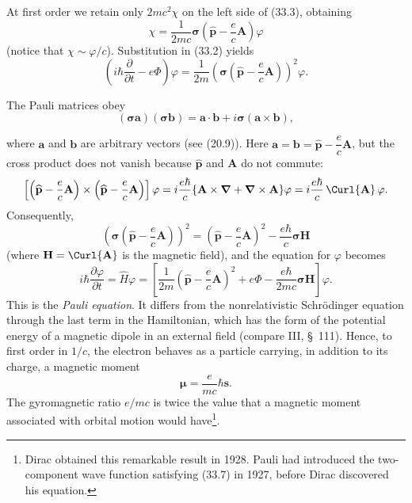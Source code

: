 At first order we retain only $2mc^2\chi$ on the left side of (33.3), obtaining
\begin{equation}
\chi=\frac1{2mc}\boldsymbol{\sigma}
\left(\widehat{\mathbf p}-\frac ec\mathbf A\right)\varphi
\tag{33.4}
\end{equation}
(notice that $\chi\sim\varphi/c$). Substitution in (33.2) yields
\[
\left(i\hbar\frac{\partial}{\partial t}-e\Phi\right)\varphi
=\frac1{2m}\left(\boldsymbol{\sigma}
\left(\widehat{\mathbf p}-\frac ec\mathbf A\right)\right)^2\varphi.
\]

The Pauli matrices obey
\begin{equation}
(\boldsymbol{\sigma}\mathbf a)(\boldsymbol{\sigma}\mathbf b)
=\mathbf a\cdot\mathbf b+i\boldsymbol{\sigma}(\mathbf a\times\mathbf b),
\tag{33.5}
\end{equation}

where $\mathbf a$ and $\mathbf b$ are arbitrary vectors (see (20.9)). Here
$\mathbf a=\mathbf b=\widehat{\mathbf p}-\dfrac ec\mathbf A$, but the cross product does not vanish because $\widehat{\mathbf p}$ and $\mathbf A$ do not commute:
\[
\left[\left(\widehat{\mathbf p}-\frac ec\mathbf A\right)
\times\left(\widehat{\mathbf p}-\frac ec\mathbf A\right)\right]\varphi
=i\frac{e\hbar}{c}\{\mathbf A\times\boldsymbol\nabla
+\boldsymbol\nabla\times\mathbf A\}\varphi
=i\frac{e\hbar}{c}\,\Curl{\mathbf A}\,\varphi.
\]
Consequently,
\begin{equation}
\left(\boldsymbol{\sigma}\left(\widehat{\mathbf p}-\frac ec\mathbf A\right)\right)^2
=\left(\widehat{\mathbf p}-\frac ec\mathbf A\right)^2
-\frac{e\hbar}{c}\boldsymbol{\sigma}\mathbf H
\tag{33.6}
\end{equation}
(where $\mathbf H=\Curl{\mathbf A}$ is the magnetic field), and the equation for $\varphi$ becomes
\begin{equation}
i\hbar\frac{\partial\varphi}{\partial t}=\widehat H\varphi
=\left[\frac1{2m}\left(\widehat{\mathbf p}-\frac ec\mathbf A\right)^2
+e\Phi-\frac{e\hbar}{2mc}\boldsymbol{\sigma}\mathbf H\right]\varphi.
\tag{33.7}
\end{equation}
This is the \emph{Pauli equation}. It differs from the nonrelativistic Schrödinger equation through the last term in the Hamiltonian, which has the form of the potential energy of a magnetic dipole in an external field (compare III, \S~111). Hence, to first order in $1/c$, the electron behaves as a particle carrying, in addition to its charge, a magnetic moment
\begin{equation}
\boldsymbol{\mu}=\frac e{mc}\hbar\mathbf s.
\tag{33.8}
\end{equation}
The gyromagnetic ratio $e/mc$ is twice the value that a magnetic moment associated with orbital motion would have\footnote{Dirac obtained this remarkable result in 1928. Pauli had introduced the two-component wave function satisfying (33.7) in 1927, before Dirac discovered his equation.}.

